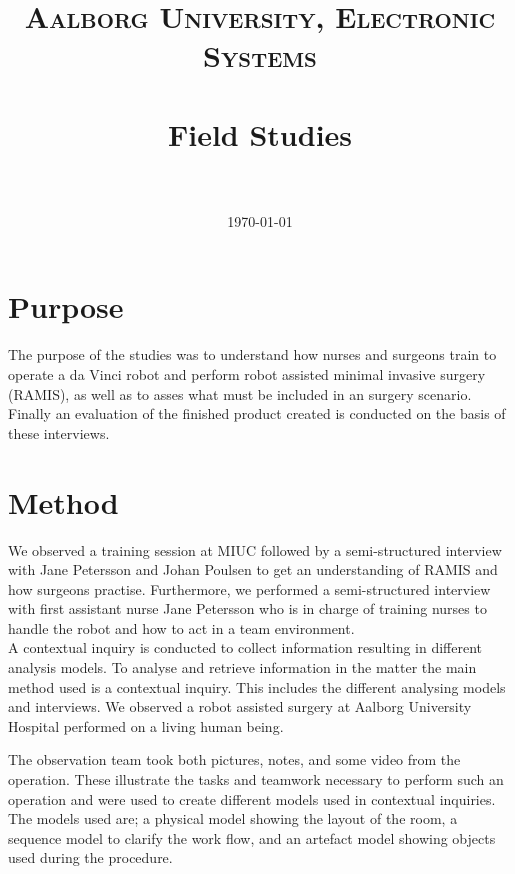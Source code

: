 \documentclass[paper=a4, fontsize=11pt]{scrartcl} %
\title{	
\normalfont \normalsize 
\textsc{Aalborg University, Electronic Systems} \\ [25pt] %
\horrule{0.5pt} \\[0.4cm] %
\huge Field Studies \\ %
\horrule{2pt} \\[0.5cm] %
}
\date{\normalsize\today} %
\numberwithin{equation}{section} %
\numberwithin{figure}{section} %
\numberwithin{table}{section} %
\begin{document}
\graphicspath{{figures/}}

\maketitle %


\section{Purpose}
The purpose of the studies was to understand how nurses and surgeons train to operate a da Vinci robot and perform robot assisted minimal invasive surgery (RAMIS), as well as to asses what must be included in an surgery scenario.  Finally an evaluation of the finished product created is conducted on the basis of these interviews. 

\section{Method}
We observed a training session at MIUC followed by a semi-structured interview with Jane Petersson and Johan Poulsen to get an understanding of RAMIS and how surgeons practise. Furthermore, we performed a semi-structured interview with first assistant nurse Jane Petersson who is in charge of training nurses to handle the robot and how to act in a team environment.\\

A contextual inquiry is conducted to collect information resulting in different analysis models.
To analyse and retrieve information in the matter the main method used is a contextual inquiry. This includes the different analysing models and interviews. We observed a robot assisted surgery at Aalborg University Hospital performed on a living human being.

The observation team took both pictures, notes, and some video from the operation. These illustrate the tasks and teamwork necessary to perform such an operation and were used to create different models used in contextual inquiries. The models used are; a physical model showing the layout of the room, a sequence model to clarify the work flow, and an artefact model showing objects used during the procedure.\\
\end{document}
